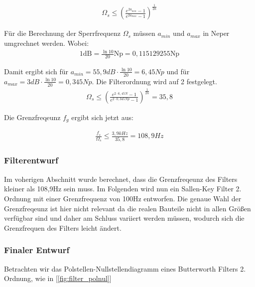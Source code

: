 \begin{align}
\Omega_s \le  \left(\frac{e^{2a_{min}}-1}{e^{2a_{max}}-1}\right)^{\frac{1}{2n}}
\end{align}



Für die Berechnung der Sperrfrequenz $\Omega_s$ müssen  $a_{min}$ und $a_{max}$ in Neper umgrechnet werden. Wobei:
\begin{align*}
1 \text{dB} =  \frac{\ln{10}}{20}\text{Np} = 0,115129255 \text{Np}   
\end{align*}

Damit ergibt sich für $a_{min}=55,9 dB\cdot \frac{\ln{10}}{20}=6,45Np$ und für  $a_{max}=3 dB\cdot \frac{\ln{10}}{20}=0,345Np$. Die Filterordnung wird auf 2 festgelegt.
\begin{align}
\Omega_s \le  \left(\frac{e^{2\cdot6,45N }-1}{e^{2\cdot 0,345Np}-1}\right)^{\frac{1}{2n}}  = 35,8
\end{align}

Die Grenzfreqeunz $f_g$ ergibt sich jetzt aus:

\begin{align}
\frac{f_s}{\Omega_s} \le \frac{3,9kHz}{35,8} = 108,9Hz
\end{align}

\subsubsection{Filterentwurf}
Im voherigen Abschnitt wurde berechnet, dass die Grenzfreqeunz des Filters kleiner als 108,9Hz sein muss.
Im Folgenden wird nun ein Sallen-Key Filter 2. Ordnung mit einer Grenzfrequenz von 100Hz entworfen.
Die genaue Wahl der Grenzfreqeunz ist hier nicht relevant da die realen Bauteile nicht in  allen Größen 
verfügbar sind und daher am Schluss variiert werden müssen, wodurch sich die Grenzfrequen des Filters leicht ändert.


\subsubsection{Finaler Entwurf}



Betrachten wir das Polstellen-Nullstellendiagramm eines Butterworth Filters 2. Ordnung, wie in [\cref{fig:filter_polnul}]


